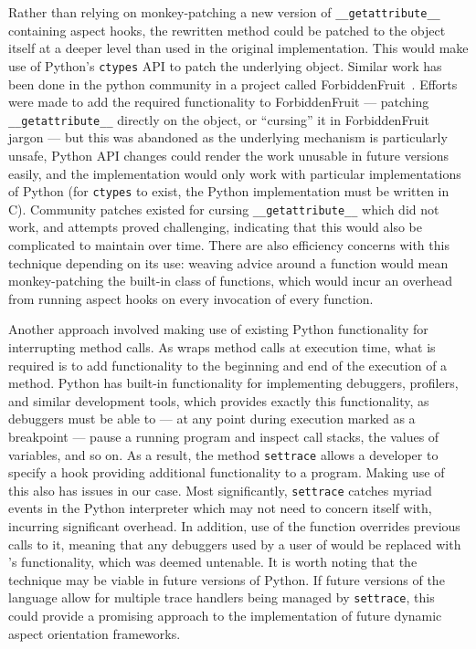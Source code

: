 Rather than relying on monkey-patching a new version of
\lstinline{__getattribute__} containing aspect hooks, the rewritten method could
be patched to the object itself at a deeper level than used in the original
\pdsf{} implementation. This would make use of Python's \lstinline{ctypes} API
to patch the underlying object. Similar work has been done in the python
community in a project called ForbiddenFruit~\cite{forbiddenfruit_repo}.
Efforts were made to add the required functionality to ForbiddenFruit ---
patching \lstinline{__getattribute__} directly on the object, or ``cursing'' it
in ForbiddenFruit jargon --- but this was abandoned as the underlying mechanism
is particularly unsafe, Python API changes could render the work unusable in
future versions easily, and the implementation would only work with particular
implementations of Python (for \lstinline{ctypes} to exist, the Python
implementation must be written in C). Community patches existed for cursing
\lstinline{__getattribute__} which did not work, and attempts proved
challenging, indicating that this would also be complicated to maintain over
time. There are also efficiency concerns with this technique depending on its
use: weaving advice around a function would mean monkey-patching the built-in
class of functions, which would incur an overhead from running aspect hooks on
every invocation of every function.

Another approach involved making use of existing Python functionality for
interrupting method calls. As \pdsf{} wraps method calls at execution time, what
is required is to add functionality to the beginning and end of the execution of
a method. Python has built-in functionality for implementing debuggers,
profilers, and similar development tools, which provides exactly this
functionality, as debuggers must be able to --- at any point during execution
marked as a breakpoint --- pause a running program and inspect call stacks, the
values of variables, and so on. As a result, the method \lstinline{settrace}
allows a developer to specify a hook providing additional functionality to a
program. Making use of this also has issues in our case. Most significantly,
\lstinline{settrace} catches myriad events in the Python interpreter which
\pdsf{} may not need to concern itself with, incurring significant overhead. In
addition, use of the function overrides previous calls to it, meaning that any
debuggers used by a user of \pdsf{} would be replaced with \pdsf{}'s
functionality, which was deemed untenable. It is worth noting that the technique
may be viable in future versions of Python. If future versions of the
language allow for multiple trace handlers being managed by
\lstinline{settrace}, this could provide a promising approach to the
implementation of future dynamic aspect orientation frameworks.


